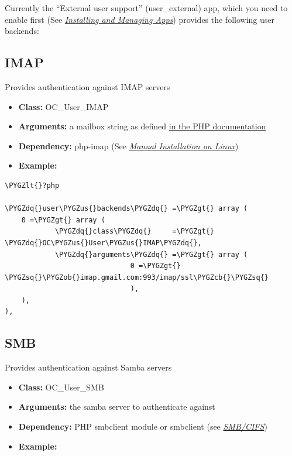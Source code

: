 \documentclass[letterpaper,10pt,english]{sphinxmanual}
\def\PYGZus{\char`\_}
\def\PYGZob{\char`\{}
\def\PYGZcb{\char`\}}
\def\PYGZlt{\char`\<}
\def\PYGZgt{\char`\>}
\def\PYGZsq{\char`\'}
\def\PYGZdq{\char`\"}
\renewcommand\PYGZsq{\textquotesingle}
\begin{document}
Currently the “External user support” (user\_external) app, which you need to
enable first (See {\hyperref[installation/apps_management_installation::doc]{\emph{\emph{Installing and Managing Apps}}}})
provides the following user backends:


\subsection{IMAP}
\label{configuration_user/user_auth_ftp_smb_imap:imap}
Provides authentication against IMAP servers
\begin{itemize}
\item {} 
\textbf{Class:} OC\_User\_IMAP

\item {} 
\textbf{Arguments:}  a mailbox string as defined \href{http://www.php.net/manual/en/function.imap-open.php}{in the PHP documentation}

\item {} 
\textbf{Dependency:} php-imap (See {\hyperref[installation/source_installation::doc]{\emph{\emph{Manual Installation on Linux}}}})

\item {} 
\textbf{Example:}

\end{itemize}

\begin{Verbatim}[commandchars=\\\{\}]
\PYGZlt{}?php

\PYGZdq{}user\PYGZus{}backends\PYGZdq{} =\PYGZgt{} array (
    0 =\PYGZgt{} array (
            \PYGZdq{}class\PYGZdq{}     =\PYGZgt{} \PYGZdq{}OC\PYGZus{}User\PYGZus{}IMAP\PYGZdq{},
            \PYGZdq{}arguments\PYGZdq{} =\PYGZgt{} array (
                              0 =\PYGZgt{} \PYGZsq{}\PYGZob{}imap.gmail.com:993/imap/ssl\PYGZcb{}\PYGZsq{}
                              ),
    ),
),
\end{Verbatim}


\subsection{SMB}
\label{configuration_user/user_auth_ftp_smb_imap:smb}
Provides authentication against Samba servers
\begin{itemize}
\item {} 
\textbf{Class:} OC\_User\_SMB

\item {} 
\textbf{Arguments:} the samba server to authenticate against

\item {} 
\textbf{Dependency:} PHP smbclient module or smbclient (see
{\hyperref[configuration_files/external_storage/smb::doc]{\emph{\emph{SMB/CIFS}}}})

\item {} 
\textbf{Example:}

\end{itemize}
\end{document}
